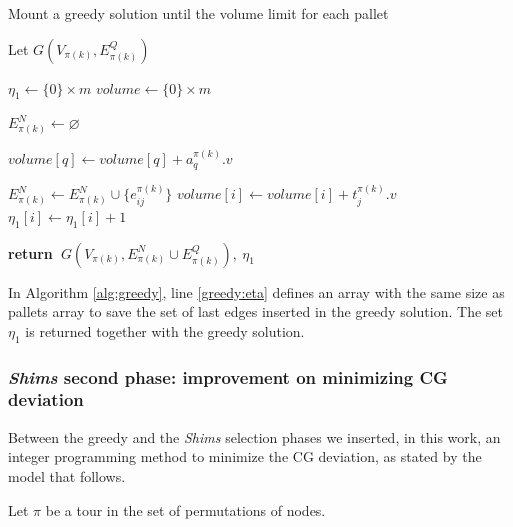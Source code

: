 \documentclass[preprint,authoryear]{elsarticle}
\renewcommand{\Return}{\State \bf {return}~}
\begin{document}
\begin{algorithm}[H]
	\caption{Mount a greedy solution until the volume limit for each pallet}  \label{alg:greedy}
	
	\begin{algorithmic}[1]
		
		
		\State Let $G(V_{\pi(k)}, E^Q_{\pi(k)})$
		
		\State $\eta_1 \gets \{0\} \times m$ \label{greedy:eta}
		\State $volume \gets \{0\} \times m$
		
		\State $E^N_{\pi(k)} \gets \varnothing$ 			
		
		\State $volume[q] \gets volume[q] + a_q^{\pi(k)}.v$ 
		\EndIf		
		\EndFor
		
		\State $E^N_{\pi(k)} \gets E^N_{\pi(k)} \cup \{e_{ij}^{\pi(k)}\}$ 
		\State $volume[i] \gets volume[i] + t_j^{\pi(k)}.v$
		\State $\eta_1[i] \gets \eta_1[i] + 1$ 	
		\EndIf
		\EndFor
		
		\Return $G(V_{\pi(k)}, E^N_{\pi(k)} \cup E^Q_{\pi(k)}),\ \eta_1$ 
		
		\EndProcedure
		
	\end{algorithmic}
\end{algorithm}

In Algorithm \ref{alg:greedy}, line \ref{greedy:eta} defines an array with the same size as pallets array to save the set of last edges inserted in the greedy solution. The set $\eta_1$ is returned together with the greedy solution.



\subsubsection{{\it Shims} second phase: improvement on minimizing CG deviation}
\label{subsection:second_phase}

Between the greedy and the {\it Shims} selection phases we inserted, in this work, an integer programming method to minimize the CG deviation, as stated by the model that follows.

Let $\pi$ be a tour in the set of permutations of nodes.
\end{document}
